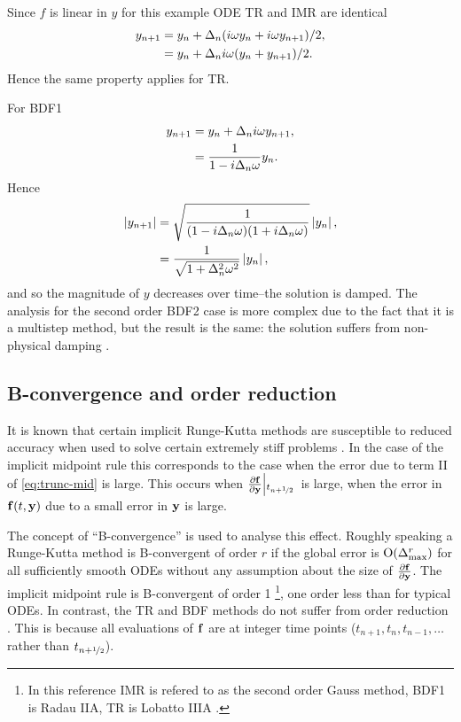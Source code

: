 Since $f$ is linear in $y$ for this example ODE TR and IMR are identical
\begin{equation}
  \begin{aligned}
    y_{n+1} &= y_n + \Delta_{n}(i\omega y_n + i\omega y_{n+1})/2, \\
    &= y_n + \Delta_{n} i \omega (y_n + y_{n+1})/2.
  \end{aligned} 
\end{equation}
Hence the same property applies for TR.

For BDF1
\begin{equation}
  \begin{aligned}
    y_{n+1} &= y_n + \Delta_{n} i \omega y_{n+1}, \\
    &= \frac{1}{1 - i \Delta_{n} \omega} y_n.
  \end{aligned}
\end{equation}
Hence
\begin{equation}
  \begin{aligned}
    \left|{y_{n+1}} \right| &= \sqrt{ \frac{1}{(1 - i \Delta_{n} \omega)(1 + i \Delta_{n} \omega)}} \left|{y_n} \right|, \\
    &= \frac{1}{\sqrt{1 + \Delta_{n}^2 \omega^2}} \left|{y_n} \right|, \\
  \end{aligned}
\end{equation}
and so the magnitude of $y$ decreases over time--the solution is damped.
The analysis for the second order BDF2 case is more complex due to the fact that it is a multistep method, but the result is the same: the solution suffers from non-physical damping \cite[265]{GreshoSani}.


\subsection{B-convergence and order reduction}
\label{sec:order-reduction}

It is known that certain implicit Runge-Kutta methods are susceptible to reduced accuracy when used to solve certain extremely stiff problems \cite[156]{Atkinson1994}\cite[225]{HairerWanner}.
In the case of the implicit midpoint rule this corresponds to the case when the error due to term II of \cref{eq:trunc-mid} is large. This occurs when $\frac{\partial {\mathbf{f}}}{\partial \mathbf{y}}{\left|_{t_{n+\nicefrac{1}{2}}{}}\right.}$ is large, \ie when the error in ${\mathbf{f}{\left( t, \mathbf{y} \right)}}$ due to a small error in $\mathbf{y}$ is large.

The concept of ``B-convergence'' is used to analyse this effect.
Roughly speaking a Runge-Kutta method is B-convergent of order $r$ if the global error is  $\text{O}{\left( \Delta_{\text{max}}^r \right)}$ for all sufficiently smooth ODEs without any assumption about the size of $\frac{\partial {\mathbf{f}}}{\partial \mathbf{y}}$.
The implicit midpoint rule is B-convergent of order 1 \cite[231]{HairerWanner}\footnote{In this reference IMR is refered to as the second order Gauss method, BDF1 is Radau IIA, TR is Lobatto IIIA \cite[72-76]{HairerWanner}.}, one order less than for typical ODEs.
In contrast, the TR and BDF methods do not suffer from order reduction \cite[159]{Atkinson1994}.
This is because all evaluations of ${\mathbf{f}}$ are at integer time points (\ie $t_{n+1}, t_{n}, t_{n-1}, \ldots$ rather than $t_{n+\nicefrac{1}{2}}$).

